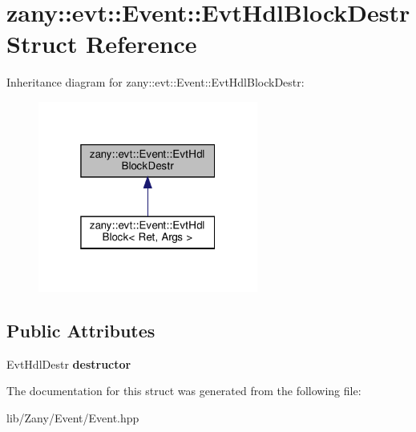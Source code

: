\hypertarget{structzany_1_1evt_1_1_event_1_1_evt_hdl_block_destr}{}\section{zany\+:\+:evt\+:\+:Event\+:\+:Evt\+Hdl\+Block\+Destr Struct Reference}
\label{structzany_1_1evt_1_1_event_1_1_evt_hdl_block_destr}


Inheritance diagram for zany\+:\+:evt\+:\+:Event\+:\+:Evt\+Hdl\+Block\+Destr\+:
\nopagebreak
\begin{figure}[H]
\begin{center}
\leavevmode
\includegraphics[width=205pt]{structzany_1_1evt_1_1_event_1_1_evt_hdl_block_destr__inherit__graph}
\end{center}
\end{figure}
\subsection*{Public Attributes}
\begin{DoxyCompactItemize}
\item 
\mbox{\label{structzany_1_1evt_1_1_event_1_1_evt_hdl_block_destr_a892694ca359e78485559e15656897dbd}} 
Evt\+Hdl\+Destr {\bfseries destructor}
\end{DoxyCompactItemize}


The documentation for this struct was generated from the following file\+:\begin{DoxyCompactItemize}
\item 
lib/\+Zany/\+Event/Event.\+hpp\end{DoxyCompactItemize}
